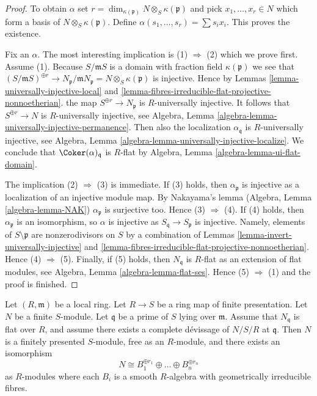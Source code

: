 \begin{proof}
To obtain $\alpha$ set
$r = \dim_{\kappa(\mathfrak p)} N \otimes_S \kappa(\mathfrak p)$ and pick
$x_1, \ldots, x_r \in N$ which form a basis of
$N \otimes_S \kappa(\mathfrak p)$. Define
$\alpha(s_1, \ldots, s_r) = \sum s_i x_i$. This proves the existence.

\medskip\noindent
Fix an $\alpha$. The most interesting implication is
(1) $\Rightarrow$ (2) which we prove first. Assume (1).
Because $S/\mathfrak mS$ is a domain with fraction field $\kappa(\mathfrak p)$
we see that
$(S/\mathfrak mS)^{\oplus r} \to
N_{\mathfrak p}/\mathfrak mN_{\mathfrak p} = N \otimes_S \kappa(\mathfrak p)$
is injective. Hence by
Lemmas \ref{lemma-universally-injective-local} and
\ref{lemma-fibres-irreducible-flat-projective-nonnoetherian}.
the map $S^{\oplus r} \to N_{\mathfrak p}$ is $R$-universally injective.
It follows that $S^{\oplus r} \to N$ is $R$-universally injective, see
Algebra, Lemma \ref{algebra-lemma-universally-injective-permanence}.
Then also the localization $\alpha_{\mathfrak q}$ is $R$-universally
injective, see
Algebra, Lemma \ref{algebra-lemma-universally-injective-localize}.
We conclude that $\Coker(\alpha)_{\mathfrak q}$ is $R$-flat by
Algebra, Lemma \ref{algebra-lemma-ui-flat-domain}.

\medskip\noindent
The implication (2) $\Rightarrow$ (3) is immediate. If (3) holds, then
$\alpha_{\mathfrak p}$ is injective as a localization of an injective
module map. By Nakayama's lemma
(Algebra, Lemma \ref{algebra-lemma-NAK})
$\alpha_{\mathfrak p}$ is surjective too. Hence (3) $\Rightarrow$ (4).
If (4) holds, then $\alpha_{\mathfrak p}$ is an isomorphism, so
$\alpha$ is injective as $S_{\mathfrak q} \to S_{\mathfrak p}$ is injective.
Namely, elements of $S \setminus \mathfrak p$ are nonzerodivisors on $S$
by a combination of
Lemmas \ref{lemma-invert-universally-injective} and
\ref{lemma-fibres-irreducible-flat-projective-nonnoetherian}.
Hence (4) $\Rightarrow$ (5). Finally, if (5) holds, then
$N_{\mathfrak q}$ is $R$-flat as an extension of flat modules, see
Algebra, Lemma \ref{algebra-lemma-flat-ses}.
Hence (5) $\Rightarrow$ (1) and the proof is finished.
\end{proof}

\begin{lemma}
\label{lemma-complete-devissage-flat-finite-type-module}
Let $(R, \mathfrak m)$ be a local ring.
Let $R \to S$ be a ring map of finite presentation.
Let $N$ be a finite $S$-module.
Let $\mathfrak q$ be a prime of $S$ lying over $\mathfrak m$.
Assume that $N_{\mathfrak q}$ is flat over $R$, and
assume there exists a complete d\'evissage of $N/S/R$ at $\mathfrak q$.
Then $N$ is a finitely presented $S$-module, free as an $R$-module,
and there exists an isomorphism
$$
N \cong B_1^{\oplus r_1} \oplus \ldots \oplus B_n^{\oplus r_n}
$$
as $R$-modules where each $B_i$ is a smooth $R$-algebra with geometrically
irreducible fibres.
\end{lemma}

